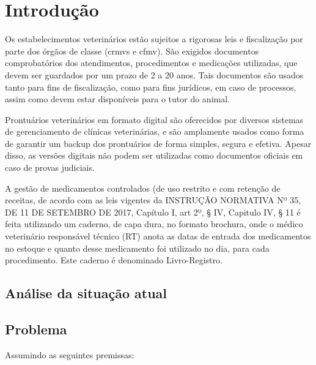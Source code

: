 

\chapter[Introdução]{Introdução}
    Os estabelecimentos veterinários estão sujeitos a rigorosas leis e fiscalização por parte dos órgãos de classe (\acs{crmvs} e \acs{cfmv}). São exigidos documentos comprobatórios dos atendimentos, procedimentos e medicações utilizadas, que devem ser guardados por um prazo de 2 a 20 anos. Tais documentos são usados tanto para fins de fiscalização, como para fins jurídicos, em caso de processos, assim como devem estar disponíveis para o tutor do animal.
    
    Prontuários veterinários em formato digital são oferecidos por diversos sistemas de gerenciamento de clínicas veterinárias, e são amplamente usados como forma de garantir um backup dos prontuários de forma simples, segura e efetiva.
    Apesar disso, as versões digitais não podem ser utilizadas como documentos oficiais em caso de provas judiciais. 
    
    A gestão de medicamentos controlados (de uso restrito e com retenção de receitas, de acordo com as leis vigentes da INSTRUÇÃO NORMATIVA Nº 35, DE 11 DE SETEMBRO DE 2017, Capítulo I, art 2º, § IV, Capitulo IV, § 11  \cite{normativa} é feita utilizando um caderno, de capa dura, no formato brochura, onde o médico veterinário responsável técnico (RT) anota as datas de entrada dos medicamentos no estoque e quanto desse medicamento foi utilizado no dia, para cada procedimento. Este caderno é denominado Livro-Registro.


\section{Análise da situação atual}
    
\section{Problema}
    Assumindo as seguintes premissas:

